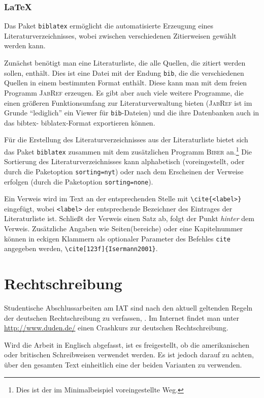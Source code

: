 \subsubsection*{\LaTeX}

Das Paket \texttt{biblatex} ermöglicht die automatisierte Erzeugung eines Literaturverzeichnisses, wobei zwischen verschiedenen Zitierweisen gewählt werden kann.

Zunächst benötigt man eine Literaturliste, die alle Quellen, die zitiert werden sollen, enthält.
Dies ist eine Datei mit der Endung \verb|bib|, die die verschiedenen Quellen in einem bestimmten Format enthält.
Diese kann man \zB mit dem freien Programm \textsc{JabRef} erzeugen.
Es gibt aber auch viele weitere Programme, die einen größeren Funktionsumfang zur Literaturverwaltung bieten (\textsc{JabRef} ist im Grunde "`lediglich"' ein Viewer für \verb|bib|-Dateien) und die ihre Datenbanken auch in das bibtex- \bzw biblatex-Format exportieren können.

Für die Erstellung des Literaturverzeichnisses aus der Literaturliste bietet sich das Paket \verb|biblatex| zusammen mit dem zusätzlichen Programm \textsc{Biber} an.\footnote{Dies ist der im Minimalbeispiel voreingestellte Weg.}
Die Sortierung des Literaturverzeichnisses kann alphabetisch (voreingestellt, oder \bspw durch die Paketoption \texttt{sorting=nyt}) oder nach dem Erscheinen der Verweise erfolgen (durch die Paketoption \texttt{sorting=none}).

Ein Verweis wird im Text an der entsprechenden Stelle mit \verb|\cite{<label>}| eingefügt, wobei \verb|<label>| der entsprechende Bezeichner des Eintrages der Literaturliste ist.
Schließt der Verweis einen Satz ab, folgt der Punkt \emph{hinter} dem Verweis.
Zusätzliche Angaben wie Seiten(bereiche) oder eine Kapitelnummer können in eckigen Klammern als optionaler Parameter des Befehles \verb|cite| angegeben werden, \zB \verb|\cite[123f]{Isermann2001}|.



\section{Rechtschreibung}

Studentische Abschlussarbeiten am IAT sind nach den aktuell geltenden Regeln der deutschen Rechtschreibung zu verfassen, \cite{Duden}.
Im Internet findet man unter \url{http://www.duden.de/} einen Crashkurs zur deutschen Rechtschreibung.

Wird die Arbeit in Englisch abgefasst, ist es freigestellt, ob die amerikanischen oder britischen Schreibweisen verwendet werden.
Es ist jedoch darauf zu achten, über den gesamten Text einheitlich eine der beiden Varianten zu verwenden.


